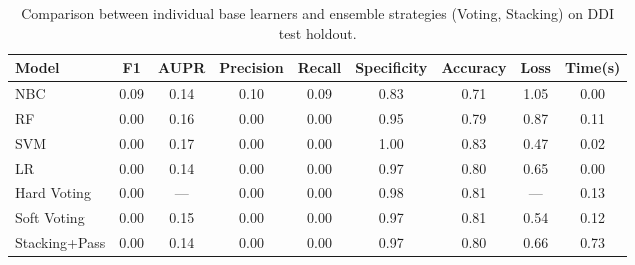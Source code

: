 \begin{table}[htbp]
\centering
\caption{Comparison between individual base learners and ensemble strategies (Voting, Stacking) on DDI test holdout.}
\label{tab:ensemble_results}
\begin{tabular}{lcccccccc}
\toprule
Model & F1 & AUPR & Precision & Recall & Specificity & Accuracy & Loss & Time(s) \\
\midrule
[Base] NBC & 0.09 & 0.14 & 0.10 & 0.09 & 0.83 & 0.71 & 1.05 & 0.00 \\
[Base] RF & 0.00 & 0.16 & 0.00 & 0.00 & 0.95 & 0.79 & 0.87 & 0.11 \\
[Base] SVM & 0.00 & 0.17 & 0.00 & 0.00 & 1.00 & 0.83 & 0.47 & 0.02 \\
[Base] LR & 0.00 & 0.14 & 0.00 & 0.00 & 0.97 & 0.80 & 0.65 & 0.00 \\
Hard Voting & 0.00 & — & 0.00 & 0.00 & 0.98 & 0.81 & — & 0.13 \\
Soft Voting & 0.00 & 0.15 & 0.00 & 0.00 & 0.97 & 0.81 & 0.54 & 0.12 \\
Stacking+Pass & 0.00 & 0.14 & 0.00 & 0.00 & 0.97 & 0.80 & 0.66 & 0.73 \\
\bottomrule
\end{tabular}
\end{table}